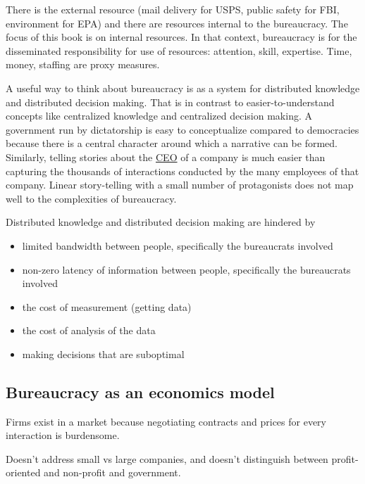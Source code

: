 There is the external resource (mail delivery for USPS, public safety for FBI, environment for EPA) and there are resources internal to the bureaucracy. The focus of this book is on internal resources. In that context, bureaucracy is for the disseminated responsibility for use of resources: attention, skill, expertise. Time, money, staffing are proxy measures.



A useful way to think about bureaucracy is as a system for distributed knowledge and distributed decision making. That is in contrast to easier-to-understand concepts like centralized knowledge and centralized decision making. A government run by dictatorship is easy to conceptualize compared to democracies because there is a central character around which a narrative can be formed. Similarly, telling stories about the \href{https://en.wikipedia.org/wiki/Chief_executive_officer}{CEO} of a company is much easier than capturing the thousands of interactions conducted by the many employees of that company. Linear story-telling with a small number of protagonists does not map well to the complexities of bureaucracy. 


Distributed knowledge and distributed decision making are hindered by
\begin{itemize}
    \item limited bandwidth between people, specifically the bureaucrats involved
    \item non-zero latency of information between people, specifically the bureaucrats involved
    \item the cost of measurement (getting data)
    \item the cost of analysis of the data
    \item making decisions that are suboptimal
\end{itemize}


\subsection{Bureaucracy as an economics model}
Firms exist in a market because negotiating contracts and prices for every interaction is burdensome. 

Doesn't address small vs large companies, and doesn't distinguish between profit-oriented and non-profit and government. 

